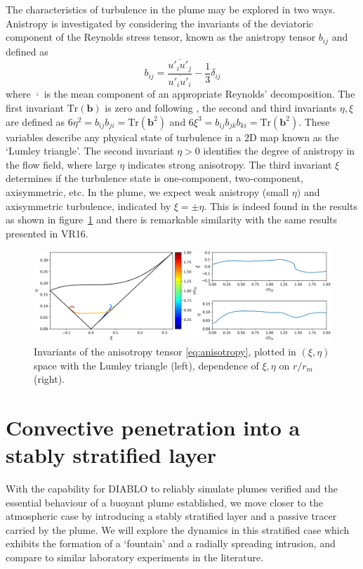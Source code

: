\documentclass[a4paper]{article}
\begin{document}
The characteristics of turbulence in the plume may be explored in two ways. Anistropy is investigated by
considering the invariants of the deviatoric component of the Reynolds stress tensor, known as the
anistropy tensor $b_{ij}$ and defined as
\begin{equation}
	b_{ij} = \frac{\overline{u'_iu'_j}}{\overline{u'_iu'_i}} - \frac{1}{3}\delta_{ij}
	\label{eq:anisotropy}
\end{equation}
where $\overline{\cdot}$ is the mean component of an appropriate Reynolds' decomposition. The first invariant
$\mathrm{Tr}(\bm{b})$ is zero and following \citet{lumley1977}, the second and third invariants $\eta, \xi$
are defined as $6\eta^2 = b_{ij}b_{ji} = \mathrm{Tr}(\bm{b}^2)$ and $6\xi^3 = b_{ij}b_{jk}b_{ki} =
\mathrm{Tr}(\bm{b}^2)$. These variables describe any physical state of turbulence in a 2D map known as the
`Lumley triangle'. The second invariant $\eta > 0$ identifies the degree of anistropy in the flow field, where
large $\eta$ indicates strong anisotropy. The third invariant $\xi$ determines if the turbulence state is
one-component, two-component, axisymmetric, etc. In the plume, we expect weak anistropy (small $\eta)$ and
axisymmetric turbulence, indicated by $\xi = \pm \eta$. This is indeed found in the results as shown in
figure~\ref{fig:turbulence} and there is remarkable similarity with the same results presented in VR16.

\begin{figure}
	\centering
	\includegraphics[width=\textwidth]{mvr/fig13}
	\caption{Invariants of the anisotropy tensor \eqref{eq:anisotropy}, plotted in $(\xi,\eta)$ space with the
		Lumley triangle (left), dependence of $\xi, \eta$ on $r/r_m$ (right).}
	\label{fig:turbulence}
\end{figure}


\section{Convective penetration into a stably stratified layer}
With the capability for DIABLO to reliably simulate plumes verified and the essential behaviour of a buoyant
plume established, we move closer to the atmospheric case by introducing a stably stratified layer and a
passive tracer carried by the plume. We will explore the dynamics in this stratified case which exhibits the
formation of a `fountain' and a radially spreading intrusion, and compare to similar laboratory experiments in
the literature.
\end{document}
